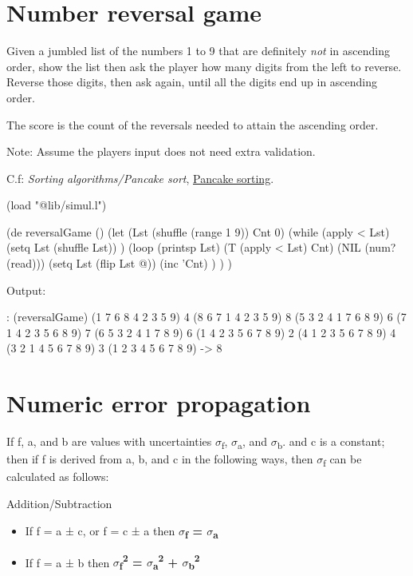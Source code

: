 \pagebreak{}
\section*{Number reversal game}

Given a jumbled list of the numbers 1 to 9 that are definitely
\emph{not} in ascending order, show the list then ask the player how
many digits from the left to reverse. Reverse those digits, then ask
again, until all the digits end up in ascending order.

The score is the count of the reversals needed to attain the ascending
order.

Note: Assume the players input does not need extra validation.

C.f: \emph{Sorting algorithms/Pancake sort},
\href{http://en.wikipedia.org/wiki/Pancake\_sorting}{Pancake sorting}.


\begin{wideverbatim}

(load "@lib/simul.l")

(de reversalGame ()
   (let (Lst (shuffle (range 1 9))  Cnt 0)
      (while (apply < Lst)
         (setq Lst (shuffle Lst)) )
      (loop
         (printsp Lst)
         (T (apply < Lst) Cnt)
         (NIL (num? (read)))
         (setq Lst (flip Lst @))
         (inc 'Cnt) ) ) )

Output:

: (reversalGame)
(1 7 6 8 4 2 3 5 9) 4
(8 6 7 1 4 2 3 5 9) 8
(5 3 2 4 1 7 6 8 9) 6
(7 1 4 2 3 5 6 8 9) 7
(6 5 3 2 4 1 7 8 9) 6
(1 4 2 3 5 6 7 8 9) 2
(4 1 2 3 5 6 7 8 9) 4
(3 2 1 4 5 6 7 8 9) 3
(1 2 3 4 5 6 7 8 9) -> 8

\end{wideverbatim}

\pagebreak{}
\section*{Numeric error propagation}


If f, a, and b are values with uncertainties $\sigma$\textsubscript{f},
$\sigma$\textsubscript{a}, and $\sigma$\textsubscript{b}. and c is a constant; then if
f is derived from a, b, and c in the following ways, then
$\sigma$\textsubscript{f} can be calculated as follows:

Addition/Subtraction

\begin{itemize}
\item
  If f = a ± c, or f = c ± a then \textbf{$\sigma$\textsubscript{f} =
  $\sigma$\textsubscript{a}}
\item
  If f = a ± b then \textbf{$\sigma$\textsubscript{f}\textsuperscript{2} =
  $\sigma$\textsubscript{a}\textsuperscript{2} +
  $\sigma$\textsubscript{b}\textsuperscript{2}}
\end{itemize}

